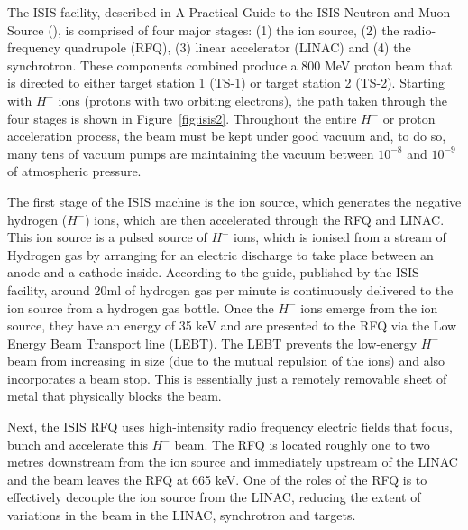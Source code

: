 \documentclass[10pt,oneside]{report}
\begin{document}
The ISIS facility, described in A Practical Guide to the ISIS Neutron and Muon Source (\citet{2021practicalguide}), is comprised of four major stages: (1) the ion source, (2) the radio-frequency quadrupole (RFQ), (3) linear accelerator (LINAC) and (4) the synchrotron. These components combined produce a 800 MeV proton beam that is directed to either target station 1 (TS-1) or target station 2 (TS-2). Starting with $H^-$ ions (protons with two orbiting electrons), the path taken through the four stages is shown in Figure~\ref{fig:isis2}. Throughout the entire $H^-$ or proton acceleration process, the beam must be kept under good vacuum and, to do so, many tens of vacuum pumps are maintaining the vacuum between $10^{-8}$ and $10^{-9}$ of atmospheric pressure.

The first stage of the ISIS machine is the ion source, which generates the negative hydrogen ($H^-$) ions, which are then accelerated through the RFQ and LINAC. This ion source is a pulsed source of $H^-$ ions, which is ionised from a stream of Hydrogen gas by arranging for an electric discharge to take place between an anode and a cathode inside. According to the guide, published by the ISIS facility, around 20ml of hydrogen gas per minute is continuously delivered to the ion source from a hydrogen gas bottle. Once the $H^-$ ions emerge from the ion source, they have an energy of 35 keV and are presented to the RFQ via the Low Energy Beam Transport line (LEBT). The LEBT prevents the low-energy $H^-$ beam from increasing in size (due to the mutual repulsion of the ions) and also incorporates a beam stop. This is essentially just a remotely removable sheet of metal that physically blocks the beam.

Next, the ISIS RFQ uses high-intensity radio frequency electric fields that focus, bunch and accelerate this $H^-$ beam. The RFQ is located roughly one to two metres downstream from the ion source and immediately upstream of the LINAC and the beam leaves the RFQ at 665 keV. One of the roles of the RFQ is to effectively decouple the ion source from the LINAC, reducing the extent of variations in the beam in the LINAC, synchrotron and targets.
\end{document}
